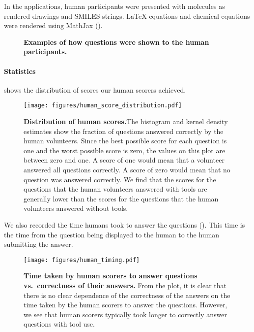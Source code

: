 In the applications, human participants were presented with molecules as rendered drawings and SMILES strings. \LaTeX\xspace equations and chemical equations were rendered using MathJax ().


\begin{figure}

    \caption{\textbf{Examples of how questions were shown to the human participants.}}
    \label{fig:screenshots}
\end{figure}

\paragraph{Statistics}
 shows the distribution of scores our human scorers achieved.

\begin{figure}[htb]
    \centering
    \texttt{[image: figures/human\_score\_distribution.pdf]}
    \caption{\textbf{Distribution of human scores.}The histogram and kernel density estimates show the fraction of questions answered correctly by the human volunteers.
    Since the best possible score for each question is one and the worst possible score is zero, the values on this plot are between zero and one. A score of one would mean that a volunteer answered all questions correctly. A score of zero would mean that no question was answered correctly.
    We find that the scores for the questions that the human volunteers answered with tools are generally lower than the scores for the questions that the human volunteers answered without tools.}
    \label{fig:human_score_distribution}
\end{figure}

We also recorded the time humans took to answer the questions (). This time is the time from the question being displayed to the human to the human submitting the answer.

\begin{figure}[htb]
    \centering
    \texttt{[image: figures/human\_timing.pdf]}
    \caption{\textbf{Time taken by human scorers to answer questions vs.\ correctness of their answers.} From the plot, it is clear that there is no clear dependence of the correctness of the answers on the time taken by the human scorers to answer the questions. However, we see that human scorers typically took longer to correctly answer questions with tool use.}
    \label{fig:human_timing}
\end{figure}

